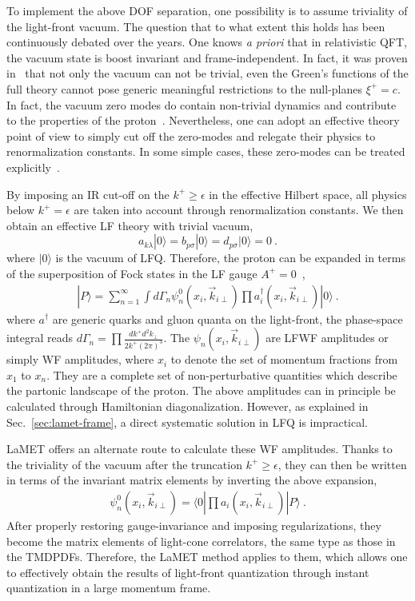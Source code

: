To implement the above DOF separation, one possibility is to
assume triviality of the light-front vacuum. The question that to what extent this holds
has been continuously debated over the years.
One knows {\it a priori} that in relativistic QFT, the vacuum state is
boost invariant and frame-independent. In fact, it was proven in~\cite{Nakanishi:1976yx,Nakanishi:1976vf}
that not only the vacuum can not be trivial, even the Green's functions of the full theory cannot
pose generic meaningful restrictions to the null-planes $\xi^+=c$.  In fact, the vacuum
zero modes do contain non-trivial dynamics and contribute to the properties of the proton~\cite{Ji:2020baz}.
Nevertheless, one can adopt an effective theory point of view to simply cut off the zero-modes
and relegate their physics to renormalization constants. In some simple cases, these zero-modes can be
treated explicitly~\cite{Heinzl:1991myy,Yamawaki:1998cy}.

By imposing an IR cut-off on the $k^+\ge \epsilon$ in the effective Hilbert space,
all physics below $k^+=\epsilon$ are taken into account through
renormalization constants. We then obtain an effective LF theory with trivial
vacuum,
\begin{equation}
	a_{k\lambda}|0\rangle = b_{p\sigma}|0\rangle = d_{p\sigma}|0\rangle=0 \ .
\end{equation}
where $|0\rangle $ is the vacuum of LFQ.
Therefore, the proton can be expanded in terms of
the superposition of Fock states in the LF gauge $A^+=0$~\cite{Brodsky:1997de},
\begin{align}
	|P\rangle=\sum_{n=1}^{\infty} \int d\Gamma_n \psi^0_n(x_i,\vec{k}_{i\perp})\prod a^{\dagger}_i(x_i, \vec{k}_{i\perp})|0\rangle \ .
\end{align}
where $a^\dagger$ are generic quarks and gluon quanta on the light-front, the phase-space integral reads $d\Gamma_n=\prod \frac{dk^+d^2k_\perp}{2k^+(2\pi)^3}$. The $\psi_n(x_i,\vec{k}_{i\perp})$
are LFWF amplitudes or simply WF amplitudes, where $x_i$ to denote the set of momentum fractions from $x_1$ to $x_n$.
They are a complete set of non-perturbative quantities which describe the partonic
landscape of the proton. The above amplitudes can in principle be calculated through Hamiltonian
diagonalization. However, as explained in Sec.~\ref{sec:lamet-frame}, a direct systematic
solution in LFQ is impractical.

LaMET offers an alternate route to calculate these WF amplitudes. Thanks to the triviality
of the vacuum after the truncation $k^+\ge \epsilon$, they can then be written in terms of the
invariant matrix elements by inverting the above expansion,
\begin{align}
	\psi^0_n(x_i,\vec{k}_{i\perp})=\langle 0|\prod a_i(x_i,\vec{k}_{i\perp})|P\rangle \ .
\end{align}
After properly restoring gauge-invariance and imposing regularizations, they
become the matrix elements of light-cone correlators, the same type as those in the
TMDPDFs. Therefore, the LaMET method applies to them, which allows one to effectively
obtain the results of light-front quantization through instant quantization in a large momentum frame.

